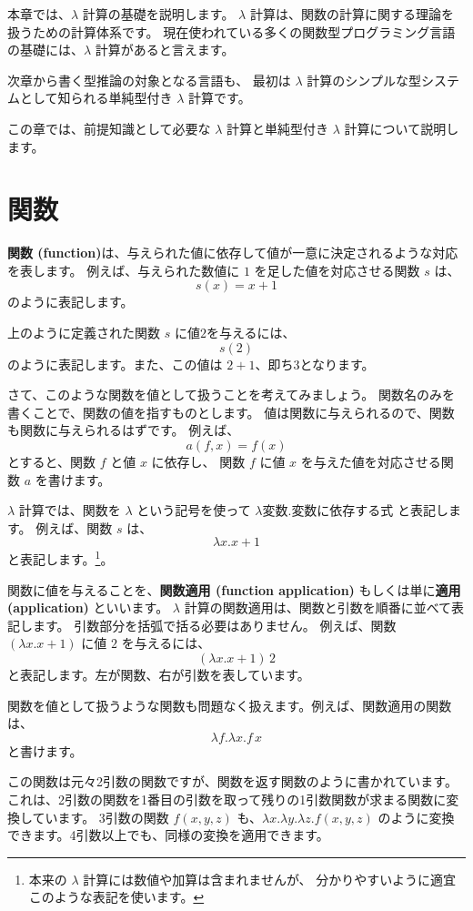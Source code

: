 
本章では、$\lambda$ 計算の基礎を説明します。
$\lambda$ 計算は、関数の計算に関する理論を扱うための計算体系です。
現在使われている多くの関数型プログラミング言語の基礎には、$\lambda$ 計算があると言えます。

次章から書く型推論の対象となる言語も、
最初は $\lambda$ 計算のシンプルな型システムとして知られる単純型付き $\lambda$ 計算です。

この章では、前提知識として必要な $\lambda$ 計算と単純型付き $\lambda$ 計算について説明します。

\section{関数}

\textbf{関数 (function)}は、与えられた値に依存して値が一意に決定されるような対応を表します。
例えば、与えられた数値に $1$ を足した値を対応させる関数 $s$ は、
\[
  s(x) = x+1
\]
のように表記します。

上のように定義された関数 $s$ に値$2$を与えるには、
\[
  s(2)
\]
のように表記します。また、この値は $2+1$、即ち$3$となります。

さて、このような関数を値として扱うことを考えてみましょう。
関数名のみを書くことで、関数の値を指すものとします。
値は関数に与えられるので、関数も関数に与えられるはずです。
例えば、
\[
  a(f, x) = f(x)
\]
とすると、関数 $f$ と値 $x$ に依存し、
関数 $f$ に値 $x$ を与えた値を対応させる関数 $a$ を書けます。

$\lambda$ 計算では、関数を $\lambda$ という記号を使って
$\lambda \text{変数} . \text{変数に依存する式}$ と表記します。
例えば、関数 $s$ は、
\[
  \lambda x . x + 1
\]
と表記します。\footnote{本来の $\lambda$ 計算には数値や加算は含まれませんが、
分かりやすいように適宜このような表記を使います。}。

関数に値を与えることを、\textbf{関数適用 (function application)}
もしくは単に\textbf{適用 (application)} といいます。
$\lambda$ 計算の関数適用は、関数と引数を順番に並べて表記します。
引数部分を括弧で括る必要はありません。
例えば、関数 $(\lambda x . x + 1)$ に値 $2$ を与えるには、
\[
  (\lambda x . x + 1) \, 2
\]
と表記します。左が関数、右が引数を表しています。

関数を値として扱うような関数も問題なく扱えます。例えば、関数適用の関数は、
\[
  \lambda f . \lambda x . f \, x
\]
と書けます。

この関数は元々2引数の関数ですが、関数を返す関数のように書かれています。
これは、2引数の関数を1番目の引数を取って残りの1引数関数が求まる関数に変換しています。
3引数の関数 $f(x, y, z)$ も、$\lambda x . \lambda y . \lambda z . f(x, y, z)$
のように変換できます。4引数以上でも、同様の変換を適用できます。

